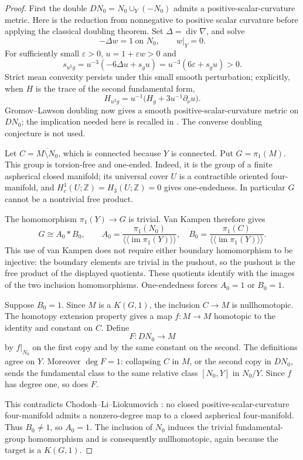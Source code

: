 \documentclass[11pt]{article}
\DeclareMathOperator{\im}{im}
\newcommand{\Z}{\mathbb Z}
\begin{document}
\begin{proof}
First the double $DN_0=N_0\cup_Y(-N_0)$ admits a positive-scalar-curvature
metric. Here is the reduction from nonnegative to positive scalar
curvature before applying the classical doubling theorem.
Set $\Delta=\operatorname{div}\nabla$, and solve
\[
 -\Delta w=1\ \text{on }N_0,\qquad w|_Y=0.
\]
For sufficiently small $\varepsilon>0$, $u=1+\varepsilon w>0$ and
\[
 s_{u^2g}=u^{-3}(-6\Delta u+s_gu)
          =u^{-3}(6\varepsilon+s_gu)>0.
\]
Strict mean convexity persists under this small smooth perturbation;
explicitly, when $H$ is the trace of the second fundamental form,
\[
 H_{u^2g}=u^{-1}\bigl(H_g+3u^{-1}\partial_\nu u\bigr).
\]
Gromov--Lawson doubling now gives a smooth positive-scalar-curvature
metric on $DN_0$; the implication needed here is recalled in
\cite[Introduction]{Frenck}. The converse doubling conjecture is not used.

Let $C=\overline{M\setminus N_0}$, which is connected because $Y$ is
connected. Put $G=\pi_1(M)$. This group is torsion-free and one-ended.
Indeed, it is the group of a finite aspherical closed manifold; its
universal cover $U$ is a contractible oriented four-manifold, and
$H_c^1(U;\Z)=H_3(U;\Z)=0$ gives one-endedness. In particular $G$ cannot
be a nontrivial free product.

The homomorphism $\pi_1(Y)\to G$ is trivial. Van Kampen therefore gives
\[
 G\cong A_0*B_0,\qquad
 A_0=\frac{\pi_1(N_0)}{\langle\!\langle\im\pi_1(Y)\rangle\!\rangle},
 \quad
 B_0=\frac{\pi_1(C)}{\langle\!\langle\im\pi_1(Y)\rangle\!\rangle}.
\]
This use of van Kampen does not require either boundary homomorphism
to be injective: the boundary elements are trivial in the pushout, so
the pushout is the free product of the displayed quotients. These
quotients identify with the images of the two inclusion homomorphisms.
One-endedness forces $A_0=1$ or $B_0=1$.

Suppose $B_0=1$. Since $M$ is a $K(G,1)$, the inclusion $C\to M$ is
nullhomotopic. The homotopy extension property gives a map $f:M\to M$
homotopic to the identity and constant on $C$. Define
\[
 F:DN_0\longrightarrow M
\]
by $f|_{N_0}$ on the first copy and by the same constant on the second.
The definitions agree on $Y$. Moreover $\deg F=1$: collapsing $C$ in
$M$, or the second copy in $DN_0$, sends the fundamental class to the
same relative class $[N_0,Y]$ in $N_0/Y$. Since $f$ has degree one, so
does $F$.

This contradicts Chodosh--Li--Liokumovich
\cite[Corollary 3]{CLL}: no closed positive-scalar-curvature
four-manifold admits a nonzero-degree map to a closed aspherical
four-manifold. Thus $B_0\ne1$, so $A_0=1$. The inclusion of $N_0$
induces the trivial fundamental-group homomorphism and is consequently
nullhomotopic, again because the target is a $K(G,1)$.
\end{proof}
\end{document}
